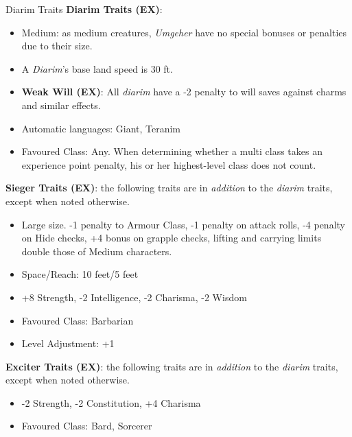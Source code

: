 \begin{35e}{Diarim Traits}
  \textbf{Diarim Traits (EX)}:
  \begin{itemize}[noitemsep]
    \item Medium: as medium creatures, \emph{Umgeher} have no special bonuses or
    penalties due to their size.
    \item A \emph{Diarim}'s base land speed is 30 ft.
    \item \textbf{Weak Will (EX)}: All \emph{diarim} have a -2 penalty to will
    saves against charms and similar effects.
    \item Automatic languages: Giant, Teranim
    \item Favoured Class: Any. When determining whether a multi class takes an
    experience point penalty, his or her highest-level class does not count.
  \end{itemize}

  \textbf{Sieger Traits (EX)}: the following traits are in \emph{addition} to
  the \emph{diarim} traits, except when noted otherwise.
  \begin{itemize}[noitemsep]
    \item Large size. -1 penalty to Armour Class, -1 penalty on attack rolls,
    -4 penalty on Hide checks, +4 bonus on grapple checks, lifting and
    carrying limits double those of Medium characters.
    \item Space/Reach: 10 feet/5 feet
    \item +8 Strength, -2 Intelligence, -2 Charisma, -2 Wisdom
    \item Favoured Class: Barbarian
    \item Level Adjustment: +1
  \end{itemize}

  \textbf{Exciter Traits (EX)}: the following traits are in \emph{addition} to
  the \emph{diarim} traits, except when noted otherwise.
  \begin{itemize}[noitemsep]
    \item -2 Strength, -2 Constitution, +4 Charisma
    \item Favoured Class: Bard, Sorcerer
  \end{itemize}
\end{35e}
